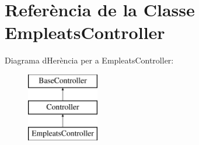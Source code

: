 \hypertarget{class_app_1_1_http_1_1_controllers_1_1_empleats_controller}{}\section{Referència de la Classe Empleats\+Controller}
\label{class_app_1_1_http_1_1_controllers_1_1_empleats_controller}
Diagrama d\textquotesingle{}Herència per a Empleats\+Controller\+:\begin{figure}[H]
\begin{center}
\leavevmode
\includegraphics[height=3.000000cm]{class_app_1_1_http_1_1_controllers_1_1_empleats_controller}
\end{center}
\end{figure}
